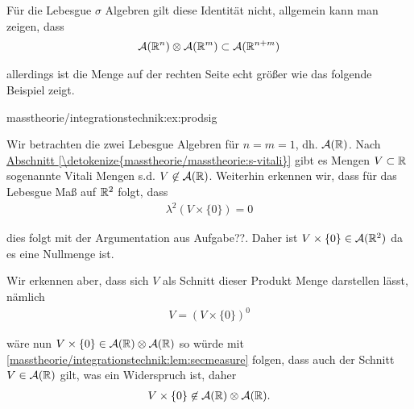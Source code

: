 \par
Für die Lebesgue \(\sigma\) Algebren gilt diese Identität nicht, allgemein kann man zeigen, dass
\begin{align*}
\mathcal{A}(\mathbb{R}^n)\otimes\mathcal{A}(\mathbb{R}^m)\subset \mathcal{A}(\mathbb{R}^{n+m})
\end{align*}
\par
allerdings ist die Menge auf der rechten Seite echt größer wie das folgende Beispiel zeigt.
\begin{example}{}{masstheorie/integrationstechnik:ex:prodsig}



\par
Wir betrachten die zwei Lebesgue Algebren für \(n=m=1\), dh. \(\mathcal{A}(\mathbb{R})\). Nach \hyperref[\detokenize{masstheorie/masstheorie:s-vitali}]{Abschnitt \ref{\detokenize{masstheorie/masstheorie:s-vitali}}} gibt es Mengen \(V\subset\mathbb{R}\) sogenannte Vitali Mengen s.d. \(V\not\in\mathcal{A}(\mathbb{R})\). Weiterhin erkennen wir, dass für das Lebesgue Maß auf \(\mathbb{R}^2\) folgt, dass
\begin{align*}
\lambda^{2}(V\times\{0\}) = 0
\end{align*}
\par
dies folgt mit der Argumentation aus Aufgabe??. Daher ist \(V\times\{0\}\in \mathcal{A}(\mathbb{R}^2)\) da es eine Nullmenge ist.

\par
Wir erkennen aber, dass sich \(V\) als Schnitt dieser Produkt Menge darstellen lässt, nämlich
\begin{align*}
V = (V\times\{0\})^0
\end{align*}
\par
wäre nun \(V\times\{0\}\in \mathcal{A}(\mathbb{R})\otimes\mathcal{A}(\mathbb{R})\) so würde mit \cref{masstheorie/integrationstechnik:lem:secmeasure} folgen, dass auch der Schnitt \(V\in\mathcal{A}(\mathbb{R})\) gilt, was ein Widerspruch ist, daher
\begin{align*}
V\times\{0\} \not\in  \mathcal{A}(\mathbb{R})\otimes\mathcal{A}(\mathbb{R}).
\end{align*}\end{example}

